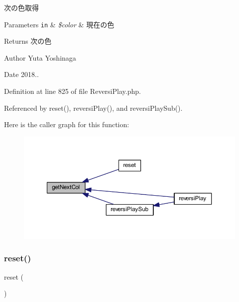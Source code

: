 次の色取得 


\begin{DoxyParams}[1]{Parameters}
\mbox{\tt in}  & {\em \$color} & 現在の色 \\
\hline
\end{DoxyParams}
\begin{DoxyReturn}{Returns}
次の色 
\end{DoxyReturn}
\begin{DoxyAuthor}{Author}
Yuta Yoshinaga 
\end{DoxyAuthor}
\begin{DoxyDate}{Date}
2018.. 
\end{DoxyDate}


Definition at line 825 of file Reversi\+Play.\+php.



Referenced by reset(), reversi\+Play(), and reversi\+Play\+Sub().

Here is the caller graph for this function\+:\nopagebreak
\begin{figure}[H]
\begin{center}
\leavevmode
\includegraphics[width=350pt]{class_reversi_play_a26fd2d7723695b69cbfde7e16b55b096_icgraph}
\end{center}
\end{figure}
\mbox{\label{class_reversi_play_a4a20559544fdf4dcb457e258dc976cf8}} 
\subsubsection{\texorpdfstring{reset()}{reset()}}
{\footnotesize\ttfamily reset (\begin{DoxyParamCaption}{ }\end{DoxyParamCaption})}



